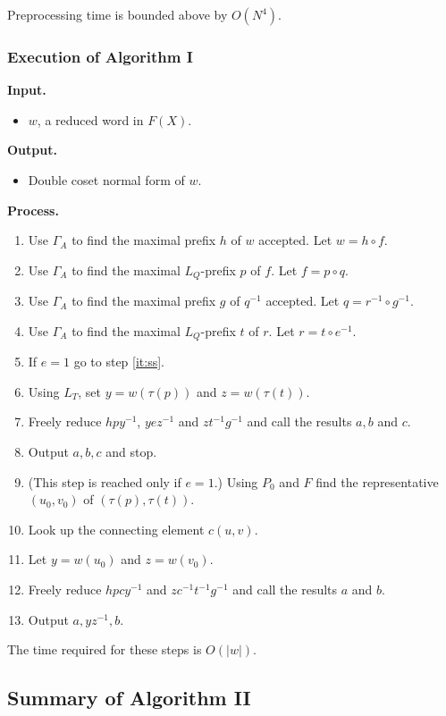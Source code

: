 \documentclass[a4paper,12pt]{article}
\newcommand{\G}{\Gamma }
\renewcommand{\t}{\tau }
\numberwithin{equation}{section}
\numberwithin{figure}{section}
\newcommand{\be}{\begin{enumerate}}
\newcommand{\ee}{\end{enumerate}}
\newcommand{\biz}{\begin{itemize}}
\newcommand{\eiz}{\end{itemize}}
\begin{document}
Preprocessing time is bounded above by $O(N^4)$.
\subsubsection{Execution of Algorithm I}
\noindent\textbf{Input.}
\biz
\item $w$, a reduced word in $F(X)$.
\eiz
\noindent\textbf{Output.}
\biz
\item Double coset normal form of $w$.
\eiz
\noindent\textbf{Process.}
\be
\item Use $\G_A$ to find the maximal prefix $h$ of $w$ accepted.
Let $w=h\circ f$.
\item Use $\G_A$ to find the maximal $L_Q$-prefix $p$ of $f$.
Let $f=p\circ q$.
\item Use $\G_A$ to find the maximal prefix $g$ of $q^{-1}$ accepted.
Let $q=r^{-1}\circ g^{-1}$.
\item Use $\G_A$ to find the maximal $L_Q$-prefix $t$ of $r$.
Let $r=t\circ e^{-1}$.
\item If $e=1$ go to step \ref{it:ss}.
\item Using $L_T$, set $y=w(\t(p))$ and $z=w(\t(t))$.
\item Freely reduce $hpy^{-1}$, $yez^{-1}$ and $zt^{-1}g^{-1}$ and
call the results   $a, b$ and $c$.
\item Output $a,b,c$ and stop.
\item\label{it:ss} (This step is reached only if $e= 1$.)
 Using $P_0$ and $F$ find the representative $(u_0,v_0)$ of $(\t(p),\t(t))$.
\item Look up the connecting element $c(u,v)$.
\item Let $y=w(u_0)$ and $z=w(v_0)$.
\item Freely reduce $hpcy^{-1}$ and $zc^{-1}t^{-1}g^{-1}$ and call the
results $a$ and $b$.
\item Output $a,yz^{-1},b$.
\ee
The time required for these steps is $O(|w|)$.

\subsection{Summary of Algorithm II}\label{subs_summaryII}
\end{document}
